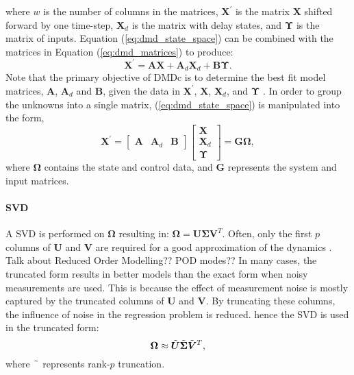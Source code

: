     where $w$ is the number of columns in the matrices, 
    $\bm{X^\prime}$ is the matrix $\bm{X}$ shifted forward by one time-step, 
    $\bm{X}_d$ is the matrix with delay states, 
    and $\bm{\Upsilon}$ is the matrix of inputs.
    Equation (\ref{eq:dmd_state_space}) can be combined with the matrices in Equation (\ref{eq:dmd_matrices}) to produce:
    \begin{equation}
        \bm{X^\prime} = \bm{A} \bm{X} + \bm{A}_d \bm{X}_d + \bm{B} \bm{\Upsilon} .
    \end{equation}
    Note that the primary objective of DMDc is to determine the best fit model matrices, $\bm{A}$, $\bm{A}_d$ and $\bm{B}$, 
    given the data in $\bm{X^\prime}$, $\bm{X}$, $\bm{X}_d$, and $\bm{\Upsilon}$ \cite{Proctor2016c}.
    In order to group the unknowns into a single matrix, (\ref{eq:dmd_state_space}) is manipulated into the form,
    \begin{equation} \label{eq:G_Omega}
        \bm{X^\prime} =   
        \begin{bmatrix} 
            \bm{A} & \bm{A}_d & \bm{B} 
        \end{bmatrix}
        \begin{bmatrix} 
            \bm{X} \\ \bm{X}_d \\ \bm{\Upsilon} 
        \end{bmatrix} 
        = \bm{G \Omega} ,
    \end{equation} 
    where $\bm{\Omega}$ contains the state and control data, and $\bm{G}$ represents the system and input matrices.
    
    \paragraph{SVD}
    A SVD is performed on $\bm{\Omega}$ resulting in:
    \(
        \bm{\Omega} = \bm{U} \bm{\Sigma} \bm{V}^T
    \).
    Often, only the first $p$ columns of $\bm{U}$ and $\bm{V}$ are required for a good approximation of the dynamics \cite{Brunton2017a}.
    Talk about Reduced Order Modelling??
    POD modes??
    In many cases, the truncated form results in better models than the exact form when noisy measurements are used.
    This is because the effect of measurement noise is mostly captured by the truncated columns of $\bm{U}$ and $\bm{V}$.
    By truncating these columns, the influence of noise in the regression problem is reduced. 
    hence the SVD is used in the truncated form: 
    \begin{equation} \label{eq:tilde_svd}
        \bm{\Omega} \approx \Tilde{\bm{U}} \Tilde{\bm{\Sigma}} \Tilde{\bm{V}}^T ,
    \end{equation}
    where $\phantom{.} \Tilde{ } \phantom{.}$ represents rank-$p$ truncation.

